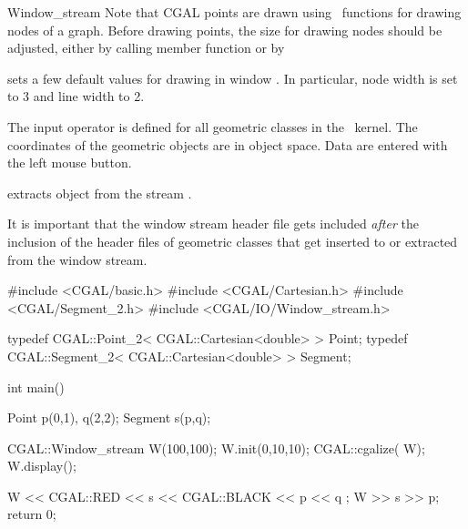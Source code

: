 \begin{ccClass} {Window_stream}
Note that CGAL points are drawn using \leda\ functions for drawing nodes of a graph.
Before drawing points, the size for drawing nodes should be adjusted, either by calling
member function  or by 

{sets a few default values for drawing in window . In particular, node width is
set to 3 and line width to 2.}



The input operator is defined for all geometric classes in the \cgal\ kernel.
The coordinates of the geometric objects are in object space. Data are
entered with the left mouse button.

       {extracts object  from the stream \ccVar.}

\ccExample

It is important that the window stream header file gets included
{\em after} the inclusion of the header files of geometric classes
that get inserted to or extracted from the window stream.

\begin{cprog}

#include <CGAL/basic.h>
#include <CGAL/Cartesian.h>
#include <CGAL/Segment_2.h>
#include <CGAL/IO/Window_stream.h>

typedef CGAL::Point_2< CGAL::Cartesian<double> >     Point;
typedef CGAL::Segment_2< CGAL::Cartesian<double> >   Segment;

int main()
{
    Point p(0,1), q(2,2);
    Segment s(p,q);

    CGAL::Window_stream W(100,100);
    W.init(0,10,10);
    CGAL::cgalize( W);
    W.display();

    W << CGAL::RED << s << CGAL::BLACK << p << q ;
    W >> s >> p;
    return 0;
}
\end{cprog} 

\end{ccClass} 
